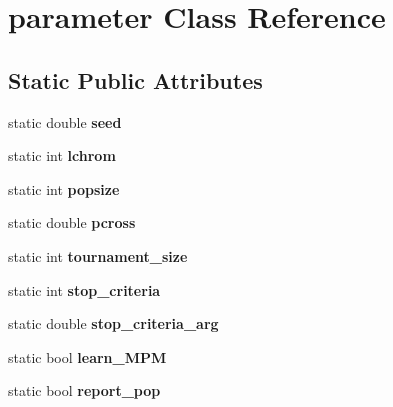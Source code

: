 \hypertarget{classparameter}{\section{parameter \-Class \-Reference}
\label{classparameter}
}
\subsection*{\-Static \-Public \-Attributes}
\begin{DoxyCompactItemize}
\item 
\hypertarget{classparameter_aab3f0908be9805c8b621624765c8b134}{static double {\bfseries seed}}\label{classparameter_aab3f0908be9805c8b621624765c8b134}

\item 
\hypertarget{classparameter_a2fc0cacd61e1eb610ad99a3bc5b72794}{static int {\bfseries lchrom}}\label{classparameter_a2fc0cacd61e1eb610ad99a3bc5b72794}

\item 
\hypertarget{classparameter_a47a4bc9c2af6a2e245c18a50c18bdc47}{static int {\bfseries popsize}}\label{classparameter_a47a4bc9c2af6a2e245c18a50c18bdc47}

\item 
\hypertarget{classparameter_aba2db05818d3c2772a4c0c3625af0b94}{static double {\bfseries pcross}}\label{classparameter_aba2db05818d3c2772a4c0c3625af0b94}

\item 
\hypertarget{classparameter_a1ab2b3b635f20653c687d8bfbb3341b0}{static int {\bfseries tournament\-\_\-size}}\label{classparameter_a1ab2b3b635f20653c687d8bfbb3341b0}

\item 
\hypertarget{classparameter_ae9f0ad477d2a257f460caa9c665d8cdc}{static int {\bfseries stop\-\_\-criteria}}\label{classparameter_ae9f0ad477d2a257f460caa9c665d8cdc}

\item 
\hypertarget{classparameter_ad5775442293740bfd028ffb3dfcc8377}{static double {\bfseries stop\-\_\-criteria\-\_\-arg}}\label{classparameter_ad5775442293740bfd028ffb3dfcc8377}

\item 
\hypertarget{classparameter_a518ba57c11cf0fa4f535890f2083867c}{static bool {\bfseries learn\-\_\-\-M\-P\-M}}\label{classparameter_a518ba57c11cf0fa4f535890f2083867c}

\item 
\hypertarget{classparameter_a7d549057f64013385ebc6f406d80bad5}{static bool {\bfseries report\-\_\-pop}}\label{classparameter_a7d549057f64013385ebc6f406d80bad5}


\end{DoxyCompactItemize}
